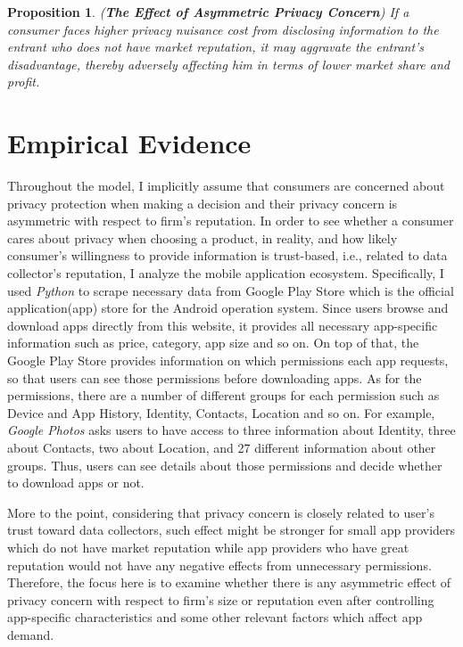 \documentclass[12pt]{article}
\newtheorem{proposition}{Proposition}
\begin{document}
\begin{proposition}(\textbf{The Effect of Asymmetric Privacy Concern})
If a consumer faces higher privacy nuisance cost from disclosing information to the entrant who does not have market reputation, it may aggravate the entrant's disadvantage, thereby adversely affecting him in terms of lower market share and profit.
\end{proposition}


\section{Empirical Evidence}

Throughout the model, I implicitly assume that consumers are concerned about privacy protection when making a decision and their privacy concern is asymmetric with respect to firm's reputation. In order to see whether a consumer cares about privacy when choosing a product, in reality, and how likely consumer's willingness to provide information is trust-based, i.e., related to data collector's reputation, I analyze the mobile application ecosystem. Specifically, I used \textit{Python} to scrape necessary data from Google Play Store which is the official application(app) store for the Android operation system. Since users browse and download apps directly from this website, it provides all necessary app-specific information such as price, category, app size and so on. On top of that, the Google Play Store provides information on which permissions each app requests, so that users can see those permissions before downloading apps. As for the permissions, there are a number of different groups for each permission such as Device and App History, Identity, Contacts, Location and so on. For example, \textit{Google Photos} asks users to have access to three information about Identity, three about Contacts, two about Location, and 27 different information about other groups. Thus, users can see details about those permissions and decide whether to download apps or not.  

More to the point, considering that privacy concern is closely related to user's trust toward data collectors, such effect might be stronger for small app providers which do not have market reputation while app providers who have great reputation would not have any negative effects from unnecessary permissions. Therefore, the focus here is to examine whether there is any asymmetric effect of privacy concern with respect to firm's size or reputation even after controlling app-specific characteristics and some other relevant factors which affect app demand. 
\end{document}
